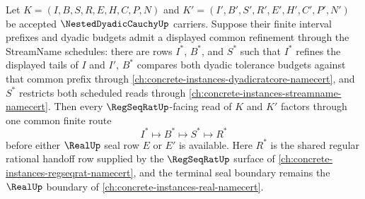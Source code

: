 \begin{theorem}
\label{thm:nested-dyadic-cauchy-tail-gluing}
Let $K=(I,B,S,R,E,H,C,P,N)$ and $K'=(I',B',S',R',E',H',C',P',N')$ be accepted $\NestedDyadicCauchyUp$ carriers. Suppose their finite interval prefixes and dyadic budgets admit a displayed common refinement through the StreamName schedules: there are rows $I^*$, $B^*$, and $S^*$ such that $I^*$ refines the displayed tails of $I$ and $I'$, $B^*$ compares both dyadic tolerance budgets against that common prefix through \autoref{ch:concrete-instances-dyadicratcore-namecert}, and $S^*$ restricts both scheduled reads through \autoref{ch:concrete-instances-streamname-namecert}. Then every $\RegSeqRatUp$-facing read of $K$ and $K'$ factors through one common finite route
$$
I^*\longmapsto B^*\longmapsto S^*\longmapsto R^*
$$
before either $\RealUp$ seal row $E$ or $E'$ is available. Here $R^*$ is the shared regular rational handoff row supplied by the $\RegSeqRatUp$ surface of \autoref{ch:concrete-instances-regseqrat-namecert}, and the terminal seal boundary remains the $\RealUp$ boundary of \autoref{ch:concrete-instances-real-namecert}.
\end{theorem}
